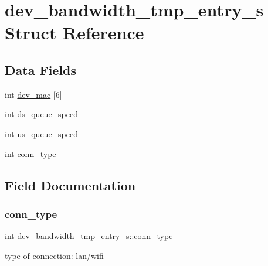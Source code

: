 \hypertarget{structdev__bandwidth__tmp__entry__s}{}\section{dev\+\_\+bandwidth\+\_\+tmp\+\_\+entry\+\_\+s Struct Reference}
\label{structdev__bandwidth__tmp__entry__s}
\subsection*{Data Fields}
\begin{DoxyCompactItemize}
\item 
int \hyperlink{structdev__bandwidth__tmp__entry__s_a6f533b180c3c3eb7ef173c8209c8de0f}{dev\+\_\+mac} \mbox{[}6\mbox{]}
\item 
int \hyperlink{structdev__bandwidth__tmp__entry__s_a56bf9fc7991732c42da8375b4c1d6c92}{ds\+\_\+queue\+\_\+speed}
\item 
int \hyperlink{structdev__bandwidth__tmp__entry__s_a63dd0fc1549cdd2204791b330618315d}{us\+\_\+queue\+\_\+speed}
\item 
int \hyperlink{structdev__bandwidth__tmp__entry__s_a44e962e539c6a96779313c92d09c917c}{conn\+\_\+type}
\end{DoxyCompactItemize}


\subsection{Field Documentation}
\mbox{\label{structdev__bandwidth__tmp__entry__s_a44e962e539c6a96779313c92d09c917c}} 
\subsubsection{\texorpdfstring{conn\+\_\+type}{conn\_type}}
{\footnotesize\ttfamily int dev\+\_\+bandwidth\+\_\+tmp\+\_\+entry\+\_\+s\+::conn\+\_\+type}

type of connection\+: lan/wifi \mbox{\label{structdev__bandwidth__tmp__entry__s_a6f533b180c3c3eb7ef173c8209c8de0f}} 
